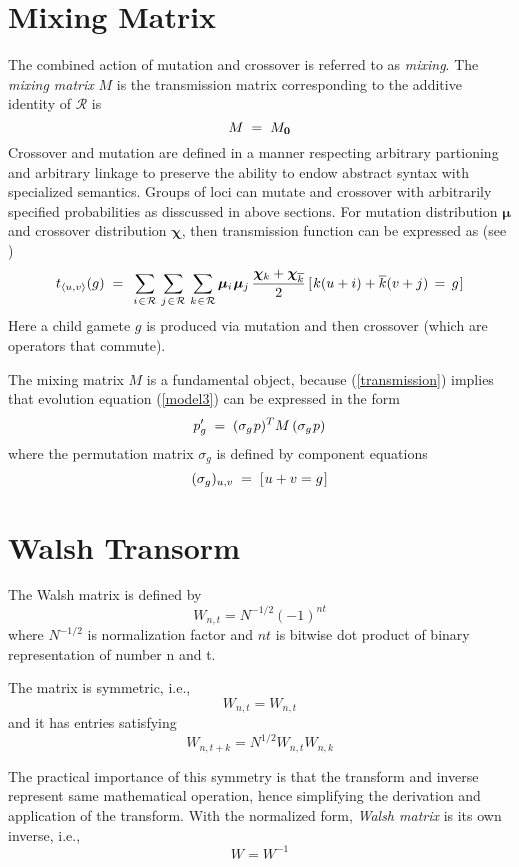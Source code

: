 \section{Mixing Matrix}
The combined action of mutation and crossover is referred to as {\em mixing}.
The {\em mixing matrix\/} $M$ is the transmission matrix corresponding to the 
additive identity of $\mathcal{R}$ is
\[
M \; = \; M_{\bf 0}\\[-0.01in]
\]
Crossover and mutation are defined in a manner respecting arbitrary partioning and arbitrary linkage to preserve the ability to endow abstract syntax with specialized semantics. Groups of loci can mutate and crossover with arbitrarily specified probabilities as disscussed in above sections. For mutation distribution $\bm{\mu}$ and crossover distribution $\bm{\chi}$, then transmission function can be expressed as (see \cite{VoseWright1998})
\begin{equation}
\label{transmission}
t_{\langle u,v \rangle}(g) \; = \;\,
\sum_{i \hspace{0.01in} \in \hspace{0.01in} \mathcal{R}} \, \sum_{j \hspace{0.01in} \in \hspace{0.01in} \mathcal{R}} \,
\sum_{k \hspace{0.01in} \in \hspace{0.01in} \mathcal{R}}
\bm{\mu}_i \hspace{0.01in} \bm{\mu}_j \, \frac{\bm{\chi}_k + \bm{\chi}_{\overline{k}}}{2} \,
[\hspace{0.01in} k (u + i) + \overline{k}(v + j) \, = \, g\hspace{0.01in}]
\end{equation}
Here a child gamete $g$ is produced via mutation and then crossover (which are operators that
commute). 

The mixing matrix $M$ is a fundamental object, because (\ref{transmission}) implies that evolution equation (\ref{model3}) can be expressed in the form
\begin{equation}
\label{model4}
p_g^\prime \; = \; (\sigma_g \hspace{0.01in} p)^T M \, (\sigma_g \hspace{0.01in} p)
\end{equation}
where the permutation matrix $\sigma_g$ is defined by component equations
\[
(\sigma_g)_{u,v} \; = \; [\hspace{0.01in} u+v = g\hspace{0.01in} ]
\]

\section{Walsh Transorm}
The Walsh matrix is defined by
\[
W_{n,t} = N^{-1/2} (-1)^{n t}
\]
where $N^{-1/2}$ is normalization factor and $n t$ is bitwise dot product of binary representation of number n and t.

The matrix is symmetric, i.e.,
\[
W_{n,t} = W_{n,t}
\]
and it has entries satisfying
\[
W_{n, t + k} = N^{1/2} W_{n, t} W_{n, k}
\]

The practical importance of this symmetry is that the transform and inverse represent same mathematical operation, hence simplifying the derivation and application of the transform. With the normalized form, \textit{Walsh matrix} is its own inverse, i.e.,
\[
W = W^{-1}
\]

